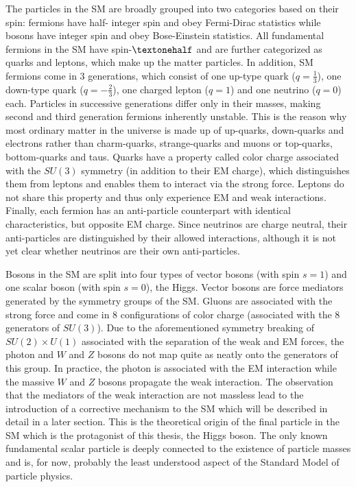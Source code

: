 The particles in the SM are broadly grouped into two categories based on their spin: fermions have half-
integer spin and obey Fermi-Dirac statistics while bosons have integer spin and obey Bose-Einstein 
statistics. All fundamental fermions in the SM have spin-$\textonehalf$ and are further categorized as quarks 
and leptons, which make up the matter particles. In addition, SM fermions come in 3 generations, which consist 
of one up-type quark ($q=\frac{1}{3}$), one down-type quark ($q=-\frac{2}{3}$), one charged lepton 
($q=1$) and one neutrino ($q=0$) each. Particles in successive generations differ only in their masses, 
making second and third generation fermions inherently unstable. This is the reason why most ordinary 
matter in the universe is made up of up-quarks, down-quarks and electrons rather than charm-quarks, 
strange-quarks and muons or top-quarks, bottom-quarks and taus. Quarks have a property called 
color charge associated with the $SU(3)$ symmetry (in addition to their EM charge),  which distinguishes 
them from leptons and enables them to interact via the strong force. Leptons do not share this property 
and thus only experience EM and weak interactions. Finally, each fermion has an anti-particle 
counterpart with identical characteristics, but opposite EM charge. Since neutrinos are charge neutral, their 
anti-particles are distinguished by their allowed interactions, although it is not yet clear whether neutrinos 
are their own anti-particles.\par

Bosons in the SM are split into four types of vector bosons (with spin $s=1$) and one scalar boson (with 
spin $s=0$), the Higgs. Vector bosons are force mediators generated by the symmetry groups of 
the SM. Gluons are associated with the strong force and come in 8 configurations of color charge 
(associated with the 8 generators of $SU(3)$). Due to the aforementioned symmetry breaking of 
$SU(2)\times U(1)$ associated with the separation of the weak and EM forces, the photon and $W$ and $Z$ 
bosons do not map quite as neatly onto the generators of this group. In practice, the photon is associated 
with the EM interaction while the massive $W$ and $Z$ bosons propagate the weak interaction. The 
observation that the mediators of the weak interaction are not massless lead to the introduction of a 
corrective mechanism to the SM which will be described in detail in a later section. This is the theoretical 
origin of the final particle in the SM which is the protagonist of this thesis, the Higgs boson. The only known 
fundamental scalar particle is deeply connected to the existence of particle masses and is, for now, probably 
the least understood aspect of the Standard Model of particle physics. \par

